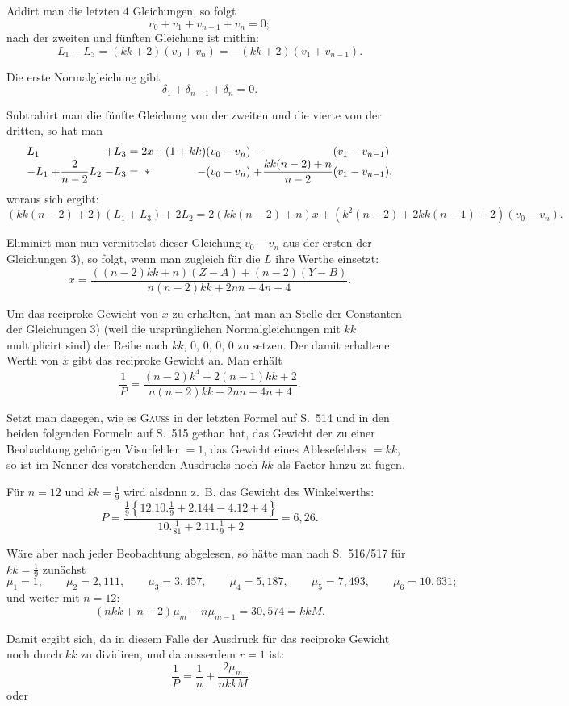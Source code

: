 Addirt man die letzten $4$ Gleichungen, so folgt
\[
 v_0+v_1+v_{n-1}+v_n=0;
\]
nach der zweiten und fünften Gleichung ist mithin:
\[
 L_1-L_3=(kk+2)(v_0+v_n)=-(kk+2)(v_1+v_{n-1}).
\]

Die erste Normalgleichung gibt
\[
 \delta_1+\delta_{n-1}+\delta_n=0.
\]

Subtrahirt man die fünfte Gleichung von der zweiten und die vierte von der dritten, so hat man
\[
\begin{array}{@{}l@{\;}r@{\;}r@{\;}c@{\;}c@{\;}r@{\;}l@{}}
 L_1 && +L_3 &=& 2x & +(1+kk)(v_0-v_n) & -\hphantom{\dfrac{kk(n-2)+n}{n-2}}(v_1-v_{n-1})\\
 -L_1 & +\dfrac{2}{n-2}L_2 & -L_3 &=& * & -(v_0-v_n) & +\dfrac{kk(n-2)+n}{n-2}(v_1-v_{n-1}),
\end{array}
\]
woraus sich ergibt:
\[
 (kk(n-2)+2)(L_1+L_3)+2L_2=2(kk(n-2)+n)x+
 (k^2(n-2)+2kk(n-1)+2)(v_0-v_n).
\]

Eliminirt man nun vermittelst dieser Gleichung $v_0-v_n$ aus der ersten der Gleichungen 3), so folgt, wenn man zugleich für die $L$ ihre Werthe einsetzt:
\[
 x=\frac{((n-2)kk+n)(Z-A)+(n-2)(Y-B)}{n(n-2)kk+2nn-4n+4}.
\]

Um das reciproke Gewicht von $x$ zu erhalten, hat man an Stelle der Constanten der Gleichungen 3) (weil die ursprünglichen Normalgleichungen mit $kk$ multiplicirt sind) der Reihe nach $kk$, $0$, $0$, $0$, $0$ zu setzen. Der damit erhaltene Werth von $x$ gibt das reciproke Gewicht an. Man erhält
\[
 \frac{1}{P}=\frac{(n-2)k^4+2(n-1)kk+2}{n(n-2)kk+2nn-4n+4}.
\]

Setzt man dagegen, wie es \textsc{Gauss} in der letzten Formel auf S.~514 und in den beiden folgenden Formeln auf S.~515 gethan hat, das Gewicht der zu einer Beobachtung gehörigen Visurfehler $=1$, das Gewicht eines Ablesefehlers $=kk$, so ist im Nenner des vorstehenden Ausdrucks noch $kk$ als Factor hinzu zu fügen.

Für $n=12$ und $kk=\frac19$ wird alsdann z.~B. das Gewicht des Winkelwerths:
\[
 P=\frac{\frac19\left\{12.10.\frac19+2.144-4.12+4\right\}}{10.\frac{1}{81}+2.11.\frac19+2}
 =6{,}26.
\]

Wäre aber nach jeder Beobachtung abgelesen, so hätte man nach S.~516/517 für $kk=\frac19$ zunächst
\[
 \mu_1=1,\qquad \mu_2=2{,}111,\qquad \mu_3=3{,}457,\qquad
 \mu_4=5{,}187,\qquad \mu_5=7{,}493,\qquad \mu_6=10{,}631;
\]
und weiter mit $n=12$:
\[
 (nkk+n-2)\mu_m-n\mu_{m-1}=30{,}574=kkM.
\]

Damit ergibt sich, da in diesem Falle der Ausdruck für das reciproke Gewicht noch durch $kk$ zu dividiren, und da ausserdem $r=1$ ist:
\[
 \frac{1}{P}=\frac{1}{n}+\frac{2\mu_m}{nkkM}
\]
oder

